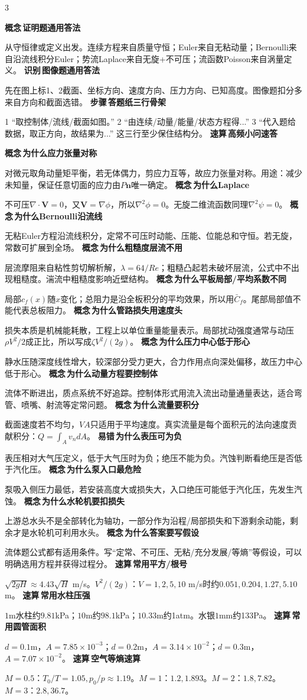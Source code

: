 \documentclass[a4paper]{article}
\newcommand{\labtag}[3]{{\bfseries\color{#1}\colorbox{#1}{\color{white}\fontsize{2.35}{2.48}\selectfont #2}\,#3}\par}
\newcommand{\iden}[1]{\labtag{C}{识别}{#1}}
\newcommand{\step}[1]{\labtag{S}{步骤}{#1}}
\newcommand{\err}[1]{\labtag{R}{易错}{#1}}
\newcommand{\concept}[1]{\labtag{V}{概念}{#1}}
\newcommand{\idq}[1]{\iden{#1}}
\newcommand{\stepq}[1]{\step{#1}}
\newcommand{\errq}[1]{\err{#1}}
\newcommand{\conceptq}[1]{\concept{#1}}
\newcommand{\quickq}[1]{\labtag{F}{速算}{#1}}
\newenvironment{vfourWrap}{\par\begingroup\fontsize{2.68}{2.84}\selectfont\setlength{\fboxsep}{0.45pt}}{\par\endgroup}
\begin{document}
\begin{multicols}{3}
\begin{vfourWrap}
\conceptq{证明题通用答法}
从守恒律或定义出发。连续方程来自质量守恒；Euler来自无粘动量；Bernoulli来自沿流线积分Euler；势流Laplace来自无旋+不可压；流函数Poisson来自涡量定义。
\idq{图像题通用答法}
先在图上标1、2截面、坐标方向、速度方向、压力方向、已知高度。图像题扣分多来自方向和截面选错。
\stepq{答题纸三行骨架}
1 “取控制体/流线/截面如图。” 2 “由连续/动量/能量/状态方程得...” 3 “代入题给数据，取正方向，故结果为...” 这三行至少保住结构分。
\quickq{高频小问速答}
\conceptq{为什么应力张量对称}
对微元取角动量矩平衡，若无体偶力，剪应力互等，故应力张量对称。用途：减少未知量，保证任意切面的应力由$P\bm n$唯一确定。
\conceptq{为什么Laplace}
不可压$\nabla\cdot\bm V=0$，又$\bm V=\nabla\phi$，所以$\nabla^2\phi=0$。无旋二维流函数同理$\nabla^2\psi=0$。
\conceptq{为什么Bernoulli沿流线}
无粘Euler方程沿流线积分，定常不可压时动能、压能、位能总和守恒。若无旋，常数可扩展到全场。
\conceptq{为什么粗糙度层流不用}
层流摩阻来自粘性剪切解析解，$\lambda=64/Re$；粗糙凸起若未破坏层流，公式中不出现粗糙度。湍流中粗糙度影响近壁结构。
\conceptq{为什么平板局部/平均系数不同}
局部$c_f(x)$随$x$变化；总阻力是沿全板积分的平均效果，所以用$\bar C_f$。尾部局部值不能代表总板阻力。
\conceptq{为什么管路损失用速度头}
损失本质是机械能耗散，工程上以单位重量能量表示。局部扰动强度通常与动压$\rho V^2/2$成正比，所以写成$\zeta V^2/(2g)$。
\conceptq{为什么压力中心低于形心}
静水压随深度线性增大，较深部分受力更大，合力作用点向深处偏移，故压力中心低于形心。
\conceptq{为什么动量方程要控制体}
流体不断进出，质点系统不好追踪。控制体形式用流入流出动量通量表达，适合弯管、喷嘴、射流等定常问题。
\conceptq{为什么流量要积分}
截面速度若不均匀，$VA$只适用于平均速度。真实流量是每个面积元的法向速度贡献积分：$Q=\int_A v_n dA$。
\errq{为什么表压可为负}
表压相对大气压定义，低于大气压时为负；绝压不能为负。汽蚀判断看绝压是否低于汽化压。
\conceptq{为什么泵入口最危险}
泵吸入侧压力最低，若安装高度大或损失大，入口绝压可能低于汽化压，先发生汽蚀。
\conceptq{为什么水轮机要扣损失}
上游总水头不是全部转化为轴功，一部分作为沿程/局部损失和下游剩余动能，剩余才是水轮机可利用水头。
\conceptq{为什么答案要写假设}
流体题公式都有适用条件。写“定常、不可压、无粘/充分发展/等熵”等假设，可以明确选用方程并获得过程分。
\quickq{常用平方/根号}
$\sqrt{2gH}\approx4.43\sqrt{H}$ m/s。$V^2/(2g)$：$V=1,2,5,10$ m/s时约$0.051,0.204,1.27,5.10$m。
\quickq{常用水柱压强}
$1$m水柱约$9.81$kPa；$10$m约$98.1$kPa；$10.33$m约1atm。水银$1$mm约133Pa。
\quickq{常用圆管面积}
$d=0.1$m，$A=7.85\times10^{-3}$；$d=0.2$m，$A=3.14\times10^{-2}$；$d=0.3$m，$A=7.07\times10^{-2}$。
\quickq{空气等熵速算}
$M=0.5$：$T_0/T=1.05,p_0/p\approx1.19$。$M=1$：$1.2,1.893$。$M=2$：$1.8,7.82$。$M=3$：$2.8,36.7$。

\end{vfourWrap}
\end{multicols}
\end{document}
